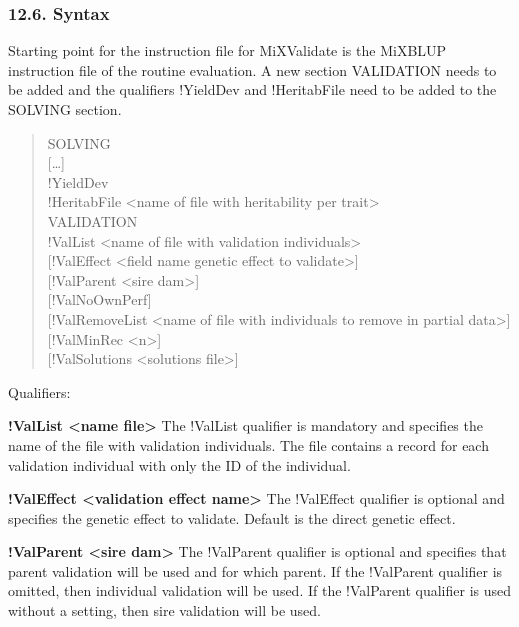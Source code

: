 \subsubsection{12.6. Syntax}\label{Vali08}

Starting point for the instruction file for MiXValidate is the MiXBLUP
instruction file of the routine evaluation. A new section VALIDATION
needs to be added and the qualifiers !YieldDev and !HeritabFile need to
be added to the SOLVING section.

\begin{quote}
SOLVING\\
{[}\ldots{]}\\
!YieldDev\\
!HeritabFile \textless name of file with heritability per
trait\textgreater{}\\
VALIDATION\\
!ValList \textless name of file with validation
individuals\textgreater{}\\
{[}!ValEffect \textless field name genetic effect to
validate\textgreater{]}\\
{[}!ValParent \textless sire \textbar{} dam\textgreater{]}\\
{[}!ValNoOwnPerf{]}\\
{[}!ValRemoveList \textless name of file with individuals to remove in
partial data\textgreater{]}\\
{[}!ValMinRec \textless n\textgreater{]}\\
{[}!ValSolutions \textless solutions file\textgreater{]}
\end{quote}

Qualifiers:

\textbf{!ValList \textless name file\textgreater{}} The !ValList
qualifier is mandatory and specifies the name of the file with
validation individuals. The file contains a record for each validation
individual with only the ID of the individual.

\textbf{!ValEffect \textless validation effect name\textgreater{}} The
!ValEffect qualifier is optional and specifies the genetic effect to
validate. Default is the direct genetic effect.

\textbf{!ValParent \textless sire \textbar{} dam\textgreater{}} The
!ValParent qualifier is optional and specifies that parent validation
will be used and for which parent. If the !ValParent qualifier is
omitted, then individual validation will be used. If the !ValParent
qualifier is used without a setting, then sire validation will be used.

